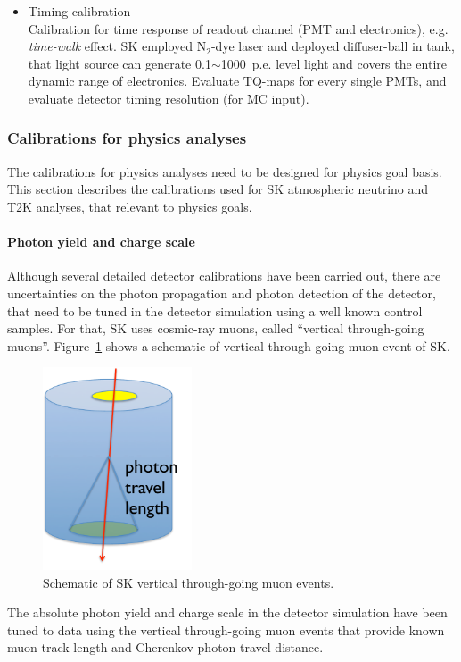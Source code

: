 \begin{itemize}
\item Timing calibration\\
  Calibration for time response of readout channel (PMT and electronics), e.g. {\it time-walk}
  effect.
  SK employed N$_2$-dye laser and deployed diffuser-ball in tank, that light source can generate
  0.1$\sim$1000~p.e. level light and covers the entire dynamic range of electronics.
  Evaluate TQ-maps for every single PMTs, and evaluate detector timing resolution (for MC input).

\end{itemize}


\subsubsection{Calibrations for physics analyses}

The calibrations for physics analyses need to be designed for physics goal basis.
This section describes the calibrations used for SK atmospheric neutrino and T2K
analyses, that relevant to \nuprismlite physics goals.

\paragraph{Photon yield and charge scale}

Although several detailed detector calibrations have been carried out, there are
uncertainties on the photon propagation and photon detection of the detector,
that need to be tuned in the detector simulation using a well known control samples.
For that, SK uses cosmic-ray muons, called ``vertical through-going muons''.
Figure~\ref{fig:sk_thru_muon} shows a schematic of vertical through-going muon event
of SK.
\begin{figure}[htb]
  \centering
  \includegraphics[height=6cm]{figures/sk_thru_muon.pdf}
  \caption{Schematic of SK vertical through-going muon events.}
  \label{fig:sk_thru_muon}
\end{figure}
The absolute photon yield and charge scale in the detector simulation have been tuned
to data using the vertical through-going muon events that provide known muon track length
and Cherenkov photon travel distance.


